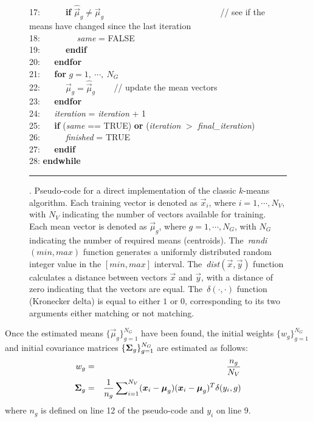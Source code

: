 \begin{figure}[!b]
\begin{small}
\begin{tabbing}
17: ~~ ~~ {\bf if} $\widehat{\Vec{\mu}}_g \neq \Vec{\mu}_g $  ~~~ ~~~ ~~~ ~~~ ~~~ ~~~ ~~~~ {\small // see if the means have changed since the last iteration} \\
18: ~~ ~~ ~~ {\it same} = FALSE \\
19: ~~ ~~ {\bf endif} \\
20: ~~ {\bf endfor} \\
21: ~~ {\bf for} $g=1, ~\cdots, ~N_G$ \\
22: ~~ ~~ $\Vec{\mu}_g = \widehat{\Vec{\mu}}_g$ ~~~ {\small // update the mean vectors} \\
23: ~~ {\bf endfor} \\
24: ~~ {\it iteration} = {\it iteration} + 1 \\
25: ~~ {\bf if} ({\it same} == TRUE) {\bf or} ({\it iteration} $>$ {\it final\_iteration})  \\
26: ~~ ~~ {\it finished} = TRUE \\
27: ~~ {\bf endif} \\
28: {\bf endwhile}
\end{tabbing}
\end{small}
\vspace{-1ex}
\hrule
\caption
  {
  \small
  .
  Pseudo-code for a direct implementation of the classic $k$-means algorithm.
  Each training vector is denoted as $\Vec{x}_i$, where $i = 1, \cdots, N_V$, with $N_V$ indicating the number of vectors available for training.
  Each mean vector is denoted as $\Vec{\mu}_g$, where $g = 1, \cdots, N_G$, with $N_G$ indicating the number of required means (centroids).
  The~{\it randi}$(min,max)$ function generates a uniformly distributed random integer value in the $[min,max]$ interval.
  The~{\it dist}$(\Vec{x},\Vec{y})$ function calculates a distance between vectors $\Vec{x}$ and $\Vec{y}$, with a distance of zero indicating that the vectors are equal.
  The~$\delta(\cdot,\cdot)$ function (Kronecker delta) is equal to either $1$ or $0$, corresponding to its two arguments either matching or not matching.
  }
\label{fig:kmeans_pseudocode}
\end{figure}

Once the estimated means $\{ \Vec{\mu}_g \}_{g=1}^{N_G}$ have been found,
the initial weights $\{ w_g \}_{g=1}^{N_G}$ and initial covariance matrices $\{ {{\boldsymbol{\Sigma}}_g} \}_{g=1}^{N_G}$
are estimated as follows:
%
\begin{eqnarray}
w_g & = & \frac{n_g}{N_V} \\
{\mbox {\boldmath $\Sigma$}_g} & = & \frac{1}{n_g} \sum\nolimits_{i=1}^{N_V} (\Vec{x}_i - \Vec{\mu}_g)(\Vec{x}_i - \Vec{\mu}_g)^T \delta(y_i, g)
\label{eqn:k-means_cov}
\end{eqnarray}
%
\noindent
where $n_g$ is defined on line 12 of the pseudo-code and $y_i$ on line 9.



